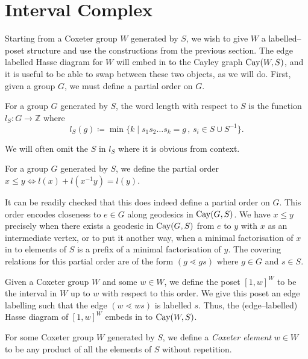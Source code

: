 \documentclass[class=article, crop=false]{standalone}
\begin{document}
\section{Interval Complex}
\label{sec:interval_cx}
Starting from a Coxeter group $W$ generated by $S$, we wish to give $W$ a labelled--poset structure and use the constructions from the previous section. The edge labelled Hasse diagram for $W$ will embed in to the Cayley graph $\text{Cay}(W,S)$, and it is useful to be able to swap between these two objects, as we will do. First, given a group $G$, we must define a partial order on $G$.

\begin{definition}
    For a group $G$ generated by $S$, the word length with respect to $S$ is the function $l_S:G\to \mathbb{Z}$ where
    \begin{equation*}
        l_S(g) \coloneq \min\{k \mid s_1s_2\ldots s_k=g \,,\, s_i \in S \cup S^{-1}\}.
    \end{equation*}
\end{definition}
We will often omit the $S$ in $l_S$ where it is obvious from context.

\begin{definition}
    For a group $G$ generated by $S$, we define the partial order $x \leq y \iff l(x) + l(x^{-1}y) = l(y)$.
\end{definition}

It can be readily checked that this does indeed define a partial 
order on $G$. This order encodes closeness to $e \in G$ along geodesics in $\text{Cay}(G,S)$. We have $x \leq y$ precisely when there exists a geodesic in $\text{Cay}(G, S)$ from $e$ to $y$ with $x$ as an intermediate vertex, or to put it another way, when a minimal factorisation of $x$ in to elements of $S$ is a prefix of a minimal factorisation of $y$. The covering relations for this partial order are of the form $(g \lessdot gs)$ where $g \in G$ and $s \in S$.


Given a Coxeter group $W$ and some $w \in W$, we define the poset $[1,w]^W$ to be the interval in $W$ up to $w$ with respect to this order. We give this poset an edge labelling such that the edge $(w \lessdot ws)$ is labelled $s$. Thus, the (edge--labelled) Hasse diagram of $[1,w]^W$ embeds in to $\text{Cay}(W,S)$.

\begin{definition}
	For some Coxeter group $W$ generated by $S$, we define a \emph{Coxeter element} $w\in W$ to be any product of all the elements of $S$ without repetition.
\end{definition}
\end{document}
